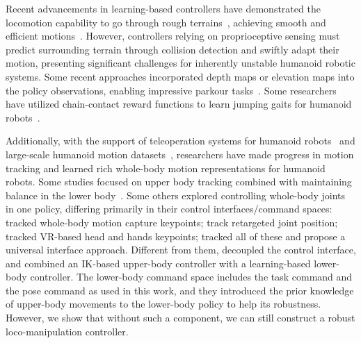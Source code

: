 Recent advancements in learning-based controllers have demonstrated the locomotion capability to go through rough terrains~\citep{scironot2024humanoid, rss2024denoisingworldmodel}, achieving smooth and efficient motions~\citep{chen2024learning}.
However, controllers relying on proprioceptive sensing must predict surrounding terrain through collision detection and swiftly adapt their motion, presenting significant challenges for inherently unstable humanoid robotic systems.
Some recent approaches incorporated depth maps or elevation maps into the policy observations, enabling impressive parkour tasks~\citep{zhuang2024humanoid,long2024learning}.
Some researchers have utilized chain-contact reward functions to learn jumping gaits for humanoid robots~\citep{zhang2024wococo}. 

Additionally, with the support of teleoperation systems for humanoid robots~\citep{cheng2024tv, fu2024mobile} and large-scale humanoid motion datasets~\citep{mahmood2019amass}, researchers have made progress in motion tracking and learned rich whole-body motion representations for humanoid robots.
Some studies focused on upper body tracking combined with maintaining balance in the lower body~\citep{cheng2024expressive}. Some others explored controlling whole-body joints in one policy, differing primarily in their control interfaces/command spaces: \citeauthor{he2024learning} tracked whole-body motion capture keypoints; \citeauthor{fu2024humanplus,2024exbody2} track retargeted joint position; \citeauthor{he2024omnih2o} tracked VR-based head and hands keypoints; \citeauthor{he2024hover} tracked all of these and propose a universal interface approach. Different from them, \citeauthor{lu2024pmp} decoupled the control interface, and combined an IK-based upper-body controller with a learning-based lower-body controller. The lower-body command space includes the task command and the pose command as used in this work, and they introduced the prior knowledge of upper-body movements to the lower-body policy to help its robustness. However, we show that without such a component, we can still construct a robust loco-manipulation controller.

